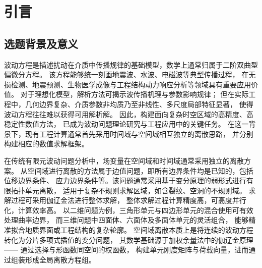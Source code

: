 ﻿\chapter{引言}
\section{选题背景及意义}
波动方程是描述扰动在介质中传播规律的基础模型，数学上通常归属于二阶双曲型偏微分方程\cite{HHDX198902004}。
该方程能够统一刻画地震波、水波、电磁波等典型传播过程，
在无损检测、地震预测、生物医学成像与工程结构动力响应分析等领域具有重要应用价值\cite{YJCO202124010,DQWJ200404038,SCSN200904021}。
对于理想化模型，解析方法可揭示波传播机理与参数影响规律；
但在实际工程中，几何边界复杂、介质参数非均质乃至非线性、多尺度局部特征显著，
使得波动方程往往难以获得可用解析解。
因此，构建面向复杂时空区域的高精度、高稳定性数值方法，
已成为波动问题理论研究与工程应用中的关键任务\cite{shen2024}。
在这一背景下，现有工程计算通常首先采用时间域与空间域相互独立的离散思路，
并分别构建相应的数值求解框架。

在传统有限元波动问题分析\cite{NSTLBB25AEC4626EE6B6F3890B70D794E625}中，场变量在空间域和时间域通常采用独立的离散方案。
从空间域进行离散的方法属于边值问题，即所有边界条件均是已知的，包括位移边界条件、
应力边界条件等。该问题通常采用基于变分原理的弱形式进行有限拓扑单元离散，
适用于复杂不规则求解区域，如含裂纹、空洞的不规则域。
求解过程可采用伽辽金法进行整体求解，
整体求解过程计算精度高，可高度并行化，计算效率高。
以二维问题为例，三角形单元与四边形单元的混合使用可有效处理曲率边界，
而三维问题中四面体、六面体及多面体单元的灵活组合，
能够精准拟合地质界面或工程结构的复杂轮廓。
空间域离散本质上是将连续的波动方程转化为分片多项式插值的变分问题，
其数学基础源于加权余量法中的伽辽金原理 —— 通过选择与形函数同空间的权函数，
构建单元刚度矩阵与荷载向量，进而通过组装形成全局离散方程组。

